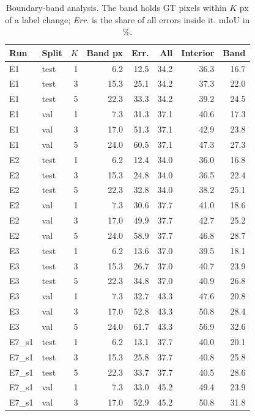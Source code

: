 \begin{table}[t]
\centering
\small
\caption{Boundary-band analysis. The band holds GT pixels within $K$ px of a label change; \emph{Err.} is the share of all errors inside it. mIoU in \%.}
\label{tab:boundary_band}
\setlength{\tabcolsep}{3pt}
\begin{tabular}{llrrrrrr}
\toprule
Run & Split & $K$ & Band px & Err. & All & Interior & Band \\
\midrule
E1 & test & 1 & 6.2 & 12.5 & 34.2 & 36.3 & 16.7 \\
E1 & test & 3 & 15.3 & 25.1 & 34.2 & 37.3 & 22.0 \\
E1 & test & 5 & 22.3 & 33.3 & 34.2 & 39.2 & 24.5 \\
E1 & val & 1 & 7.3 & 31.3 & 37.1 & 40.6 & 17.3 \\
E1 & val & 3 & 17.0 & 51.3 & 37.1 & 42.9 & 23.8 \\
E1 & val & 5 & 24.0 & 60.5 & 37.1 & 47.3 & 27.3 \\
E2 & test & 1 & 6.2 & 12.4 & 34.0 & 36.0 & 16.8 \\
E2 & test & 3 & 15.3 & 24.8 & 34.0 & 36.5 & 22.4 \\
E2 & test & 5 & 22.3 & 32.8 & 34.0 & 38.2 & 25.1 \\
E2 & val & 1 & 7.3 & 30.6 & 37.7 & 41.0 & 18.6 \\
E2 & val & 3 & 17.0 & 49.9 & 37.7 & 42.7 & 25.2 \\
E2 & val & 5 & 24.0 & 58.9 & 37.7 & 46.8 & 28.7 \\
E3 & test & 1 & 6.2 & 13.6 & 37.0 & 39.5 & 18.1 \\
E3 & test & 3 & 15.3 & 26.7 & 37.0 & 40.7 & 23.9 \\
E3 & test & 5 & 22.3 & 34.8 & 37.0 & 40.9 & 26.8 \\
E3 & val & 1 & 7.3 & 32.7 & 43.3 & 47.6 & 20.8 \\
E3 & val & 3 & 17.0 & 52.8 & 43.3 & 50.8 & 28.4 \\
E3 & val & 5 & 24.0 & 61.7 & 43.3 & 56.9 & 32.6 \\
E7\_s1 & test & 1 & 6.2 & 13.1 & 37.7 & 40.0 & 20.1 \\
E7\_s1 & test & 3 & 15.3 & 25.8 & 37.7 & 40.8 & 25.8 \\
E7\_s1 & test & 5 & 22.3 & 33.7 & 37.7 & 40.5 & 28.6 \\
E7\_s1 & val & 1 & 7.3 & 33.0 & 45.2 & 49.4 & 23.9 \\
E7\_s1 & val & 3 & 17.0 & 52.9 & 45.2 & 50.8 & 31.8 \\

\end{tabular}
\end{table}
